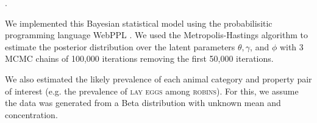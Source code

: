 \documentclass[10pt,letterpaper]{article}
\newcommand{\ndg}[1]{\textcolor{Green}{[ndg: #1]}}
\begin{document}
%
%
%
. 
%



We implemented this Bayesian statistical model using the probabilisitic programming language WebPPL \cite{dippl}. 
We used the Metropolis-Hastings algorithm to estimate the posterior distribution over the latent parameters $\theta, \gamma$, and $\phi$ with 3 MCMC chains of 100,000 iterations removing the first 50,000 iterations.


We also estimated the likely prevalence of each animal category and property pair of interest (e.g. the prevalence of \textsc{lay eggs} among \textsc{robins}). %
For this, we assume the data was generated from a Beta distribution with unknown mean and concentration. 
\end{document}
